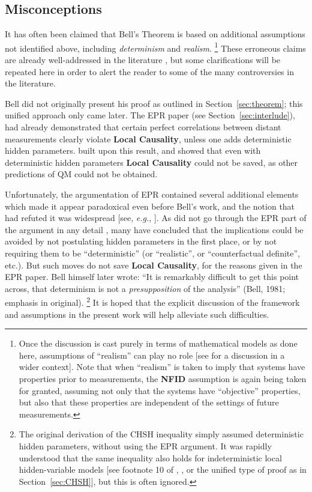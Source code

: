 \documentclass[rmp, aps, preprint, longbibliography]{revtex4-1}
\begin{document}
\subsection{Misconceptions}
\label{sec:misconceptions}

It has often been claimed that Bell's Theorem is based on additional assumptions not identified above, including \emph{determinism} and \emph{realism}.%
\footnote{Once the discussion is cast purely in terms of mathematical models as done here, assumptions of ``realism'' can play no role [see \textcite{norsen2007} for a discussion in a wider context].  Note that when ``realism'' is taken to imply that systems have properties prior to measurements, the {\bf NFID} assumption is again being taken for granted, assuming not only that the systems have ``objective'' properties, but also that these properties are independent of the settings of future measurements.}
These erroneous claims are already well-addressed in the literature \cite{norsen2007, norsen2011, norsen2017, maudlin2010, maudlin2014}, but some clarifications will be repeated here in order to alert the reader to some of the many controversies in the literature.

Bell did not originally present his proof as outlined in Section~\ref{sec:theorem}; this unified approach only came later.  The EPR paper (see Section~\ref{sec:interlude}), had already demonstrated that certain perfect correlations between distant measurements clearly violate {\bf Local Causality}, unless one adds deterministic hidden parameters.  \textcite{bell1964} built upon this result, and showed that even with deterministic hidden parameters {\bf Local Causality} could not be saved, as other predictions of QM could not be obtained.

Unfortunately, the argumentation of EPR contained several additional elements which made it appear paradoxical even before Bell's work, and the notion that \textcite{bohr1935} had refuted it was widespread [see, \emph{e.g.}, \textcite{clauser1969}].  As \textcite{bell1964} did not
go through the EPR part of the argument in any detail \cite{wiseman2014,norsen2015}, many have concluded that the implications could be avoided by not postulating hidden parameters in the first place, or by not requiring them to be ``deterministic'' (or ``realistic'', or ``counterfactual definite'', etc.).  But such moves do not save {\bf Local Causality}, for the reasons given in the EPR paper.  Bell himself later wrote: ``It is remarkably difficult to get this point across, that determinism is not a \emph{presupposition} of the analysis'' (Bell, 1981; emphasis in original)\nocite{bell1981}.%
\footnote{
The original derivation of the CHSH inequality \cite{clauser1969} simply assumed deterministic hidden parameters, without using the EPR argument.  It was rapidly understood that the same inequality also holds for indeterministic local hidden-variable models [see footnote 10 of \textcite{bell1971}, \textcite{clauser1974}, or the unified type of proof as in Section~\ref{sec:CHSH}], but this is often ignored.}
It is hoped that the explicit discussion of the framework and assumptions in the present work will help alleviate such difficulties.
\end{document}
